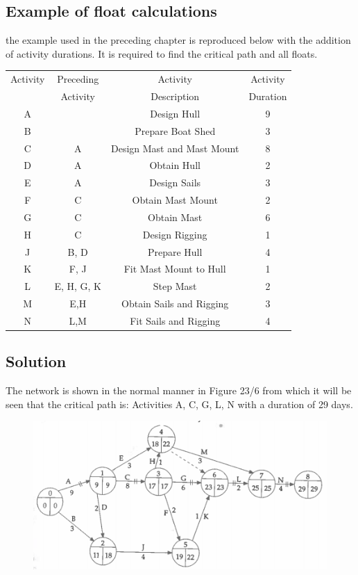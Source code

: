 \documentclass[]{report}
\begin{document}
\subsection{Example of float calculations} the example used in the preceding chapter is
 reproduced below with the addition of activity durations. It is required to find the critical path and all floats. 

\begin{center}
\begin{tabular}{|c|c|c|c|}\hline
Activity	&	Preceding	&	Activity	&	Activity	\\
&	Activity	&	Description	&	Duration	\\ \hline
A	&		&	Design Hull	&	9	\\ \hline
B	&		&	Prepare Boat Shed 	&	3	\\ \hline
C 	&	A 	&	Design Mast and Mast Mount 	&	8	\\ \hline
D 	&	A 	&	Obtain Hull 	&	2	\\ \hline
E 	&	A 	&	Design Sails 	&	3	\\ \hline
F 	&	C 	&	Obtain Mast Mount 	&	2	\\ \hline
G 	&	C 	&	Obtain Mast 	&	6	\\ \hline
H 	&	C 	&	Design Rigging 	&	1	\\ \hline
J	&	B, D 	&	Prepare Hull 	&	4	\\ \hline
K	&	F, J	&	Fit Mast Mount to Hull 	&	1	\\ \hline
L 	&	E, H, G, K 	&	Step Mast 	&	2	\\ \hline
M 	&	E,H 	&	Obtain Sails and Rigging 	&	3	\\ \hline
N 	&	L,M 	&	Fit Sails and Rigging 	&	4	\\ \hline
\end{tabular}
\end{center}
\subsection{Solution}
The network is shown in the normal manner in Figure 23/6 from which it will be seen 
that the critical path is: 
Activities A, C, G, L, N with a duration of 29 days. 
\begin{figure}[h!]
\centering
\includegraphics[width=0.4\linewidth]{images4/335-a}
\caption{}
\label{fig:335-a}
\end{figure}
\end{document}
